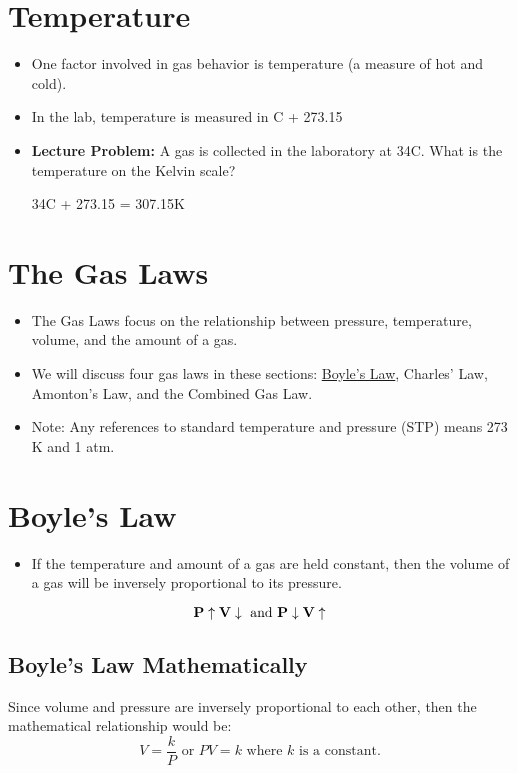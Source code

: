 \documentclass[
	chapter=5,
	title={Gases},
	showanswers=true,
]{chem122notes}
\begin{document}
\section{Temperature}\label{sec:temperature}
\begin{itemize}
	\item One factor involved in gas behavior is temperature (a measure of hot and cold).
	\item In the lab, temperature is measured in \textdegree{}C + 273.15
	\item \textbf{Lecture Problem:} A gas is collected in the laboratory at 34\textdegree{}C\@. What is the temperature on the Kelvin scale?
	\begin{answer}
		34\textdegree{}C + 273.15 = 307.15\textdegree K
	\end{answer}
\end{itemize}

\section{The Gas Laws}\label{sec:the-gas-laws}
\begin{itemize}
	\item The Gas Laws focus on the relationship between pressure, temperature, volume, and the amount of a gas.
	\item We will discuss four gas laws in these sections: \hyperref[sec:boyles-law]{Boyle's Law}, Charles' Law, Amonton's Law, and the Combined Gas Law.
	\item Note: Any references to standard temperature and pressure (STP\label{dfn:stp}) means 273 \textdegree{}K and 1 atm.
\end{itemize}

\section{Boyle's Law}\label{sec:boyles-law}
\begin{itemize}
	\item If the temperature and amount of a gas are held constant, then the volume of a gas will be inversely proportional to its pressure.
\end{itemize}
\begin{equation}
	\mbox{\textbf{P}}\uparrow\mbox{\textbf{V}}\downarrow \mbox{  and  } \mbox{\textbf{P}}\downarrow\mbox{\textbf{V}}\uparrow
	\label{eq:boyles-law}
\end{equation}

\subsection{Boyle's Law Mathematically}\label{subsec:boyle's-law-mathematically}
Since volume and pressure are inversely proportional to each other, then the mathematical relationship would be:
\[ V = \frac{k}{P} \mbox{  or  } PV = k \mbox{   where } k \mbox{ is a constant.} \]
\end{document}
